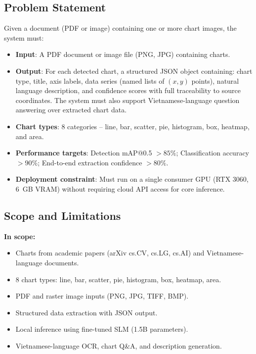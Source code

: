 \subsection{Problem Statement}

Given a document (PDF or image) containing one or more chart images, the system must:

\begin{itemize}
    \item \textbf{Input}: A PDF document or image file (PNG, JPG) containing charts.
    \item \textbf{Output}: For each detected chart, a structured JSON object containing:
          chart type, title, axis labels, data series (named lists of $(x, y)$ points),
          natural language description, and confidence scores with full traceability
          to source coordinates. The system must also support Vietnamese-language
          question answering over extracted chart data.
    \item \textbf{Chart types}: 8 categories -- line, bar, scatter, pie, histogram, box,
          heatmap, and area.
    \item \textbf{Performance targets}: Detection mAP@0.5 $> 85\%$; Classification accuracy
          $> 90\%$; End-to-end extraction confidence $> 80\%$.
    \item \textbf{Deployment constraint}: Must run on a single consumer GPU (RTX 3060,
          6~GB VRAM) without requiring cloud API access for core inference.
\end{itemize}

\subsection{Scope and Limitations}

\textbf{In scope:}
\begin{itemize}
    \item Charts from academic papers (arXiv cs.CV, cs.LG, cs.AI) and Vietnamese-language
          documents.
    \item 8 chart types: line, bar, scatter, pie, histogram, box, heatmap, area.
    \item PDF and raster image inputs (PNG, JPG, TIFF, BMP).
    \item Structured data extraction with JSON output.
    \item Local inference using fine-tuned SLM (1.5B parameters).
    \item Vietnamese-language OCR, chart Q\&A, and description generation.
\end{itemize}

